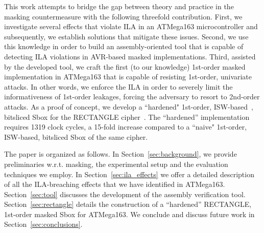 This work attempts to bridge the gap between theory and practice in the masking countermeasure with the following threefold contribution. First, we investigate several effects that violate ILA in an ATMega163 microcontroller and subsequently, we establish solutions that mitigate these issues. Second, we use this knowledge in order to build an assembly-oriented tool that is capable of detecting ILA violations in AVR-based masked implementations. Third, assisted by the developed tool, we craft the first (to our knowledge) 1st-order masked implementation in ATMega163 that is capable of resisting 1st-order, univariate attacks. In other words, we enforce the ILA in order to severely limit the informativeness of 1st-order leakages, forcing the adversary to resort to 2nd-order attacks. As a proof of concept, we develop a ``hardened" 1st-order, ISW-based~\cite{DBLP:conf/crypto/IshaiSW03}, bitsliced Sbox for the RECTANGLE cipher~\cite{DBLP:journals/chinaf/ZhangBLR0V15}. The ``hardened'' implementation requires 1319 clock cycles, a 15-fold increase compared to a ``naive" 1st-order, ISW-based, bitsliced Sbox of the same cipher. 

The paper is organized as follows. In Section~\ref{sec:background}, we provide preliminaries w.r.t. masking, the experimental setup and the evaluation techniques we employ. In Section~\ref{sec:ila_effects} we offer a detailed description of all the ILA-breaching effects that we have identified in ATMega163. 
Section~\ref{sec:tool} discusses the development of the assembly verification tool. Section~\ref{sec:rectangle} details the construction of a ``hardened'' RECTANGLE, 1st-order masked Sbox for ATMega163. We conclude and discuss future work in Section~\ref{sec:conclusions}.


